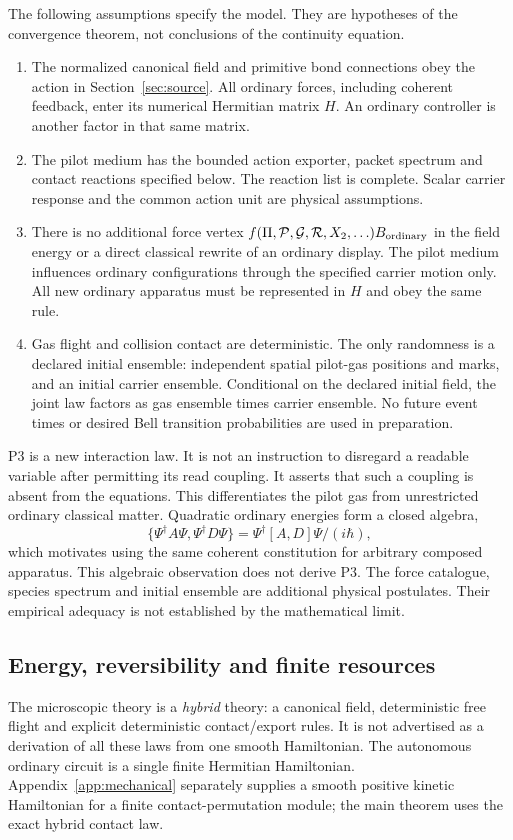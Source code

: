 \documentclass[11pt]{article}
\theoremstyle{definition}\newtheorem{definition}[theorem]{Definition}
\theoremstyle{remark}\newtheorem{remark}[theorem]{Remark}
\begin{document}
The following assumptions specify the model. They are hypotheses of the convergence theorem, not conclusions of the continuity equation.
\begin{enumerate}[label=\textbf{P\arabic*.}]
\item The normalized canonical field and primitive bond connections obey the action in Section~\ref{sec:source}. All ordinary forces, including coherent feedback, enter its numerical Hermitian matrix $H$. An ordinary controller is another factor in that same matrix.
\item The pilot medium has the bounded action exporter, packet spectrum and contact reactions specified below. The reaction list is complete. Scalar carrier response and the common action unit are physical assumptions.
\item There is no additional force vertex $f(\Pi,\mathcal P,\mathcal G,\mathcal R,X_2,\ldots)B_{\rm ordinary}$ in the field energy or a direct classical rewrite of an ordinary display. The pilot medium influences ordinary configurations through the specified carrier motion only. All new ordinary apparatus must be represented in $H$ and obey the same rule.
\item Gas flight and collision contact are deterministic. The only randomness is a declared initial ensemble: independent spatial pilot-gas positions and marks, and an initial carrier ensemble. Conditional on the declared initial field, the joint law factors as gas ensemble times carrier ensemble. No future event times or desired Bell transition probabilities are used in preparation.
\end{enumerate}
P3 is a new interaction law. It is not an instruction to disregard a readable variable after permitting its read coupling. It asserts that such a coupling is absent from the equations. This differentiates the pilot gas from unrestricted ordinary classical matter. Quadratic ordinary energies form a closed algebra,
\[
 \{\Psi^\dagger A\Psi,\Psi^\dagger D\Psi\}
   =\Psi^\dagger[A,D]\Psi/(i\hbar),
\]
which motivates using the same coherent constitution for arbitrary composed apparatus. This algebraic observation does not derive P3. The force catalogue, species spectrum and initial ensemble are additional physical postulates. Their empirical adequacy is not established by the mathematical limit.

\subsection{Energy, reversibility and finite resources}
The microscopic theory is a \emph{hybrid} theory: a canonical field, deterministic free flight and explicit deterministic contact/export rules. It is not advertised as a derivation of all these laws from one smooth Hamiltonian. The autonomous ordinary circuit is a single finite Hermitian Hamiltonian. Appendix~\ref{app:mechanical} separately supplies a smooth positive kinetic Hamiltonian for a finite contact-permutation module; the main theorem uses the exact hybrid contact law.
\end{document}
